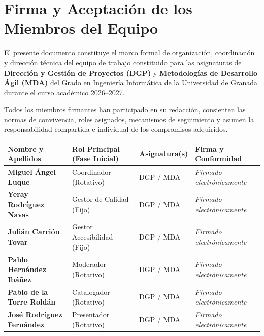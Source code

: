 \newpage
\hypersetup{pageanchor=true}

\section*{Firma y Aceptación de los Miembros del Equipo}

El presente documento constituye el marco formal de organización, coordinación y dirección técnica del equipo de trabajo constituido para las asignaturas de \textbf{Dirección y Gestión de Proyectos (DGP)} y \textbf{Metodologías de Desarrollo Ágil (MDA)} del Grado en Ingeniería Informática de la Universidad de Granada durante el curso académico 2026--2027.

Todos los miembros firmantes han participado en su redacción, consienten las normas de convivencia, roles asignados, mecanismos de seguimiento y asumen la responsabilidad compartida e individual de los compromisos adquiridos.

\vspace{0.8cm}

\noindent
\begin{tabularx}{\textwidth}{|>{\raggedright\arraybackslash}p{4.6cm}|>{\centering\arraybackslash}X|>{\centering\arraybackslash}p{2.6cm}|>{\centering\arraybackslash}p{3.8cm}|}
\hline
\rowcolor{tableHeader}
\textbf{Nombre y Apellidos} & \textbf{Rol Principal (Fase Inicial)} & \textbf{Asignatura(s)} & \textbf{Firma y Conformidad} \\
\hline
\textbf{Miguel Ángel Luque} & Coordinador (Rotativo) & DGP / MDA & \textit{Firmado electrónicamente} \\
\hline
\textbf{Yeray Rodríguez Navas} & Gestor de Calidad (Fijo) & DGP / MDA & \textit{Firmado electrónicamente} \\
\hline
\textbf{Julián Carrión Tovar} & Gestor Accesibilidad (Fijo) & DGP / MDA & \textit{Firmado electrónicamente} \\
\hline
\textbf{Pablo Hernández Ibáñez} & Moderador (Rotativo) & DGP / MDA & \textit{Firmado electrónicamente} \\
\hline
\textbf{Pablo de la Torre Roldán} & Catalogador (Rotativo) & DGP / MDA & \textit{Firmado electrónicamente} \\
\hline
\textbf{José Rodríguez Fernández} & Presentador (Rotativo) & DGP / MDA & \textit{Firmado electrónicamente} \\
\hline
\end{tabularx}

